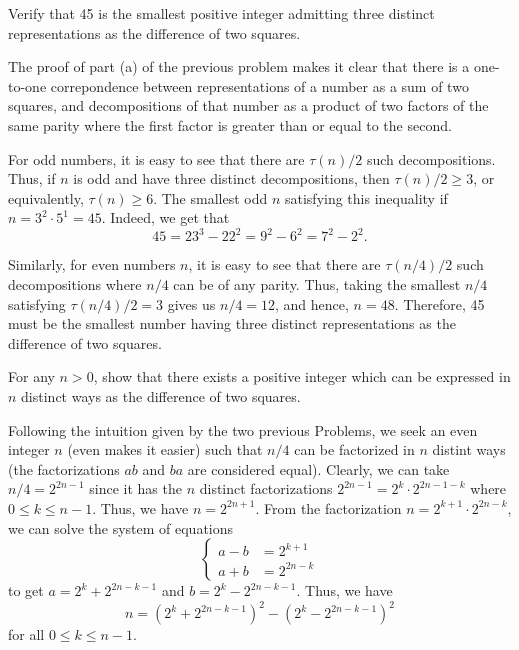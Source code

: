 \begin{exercise}
    Verify that 45 is the smallest positive integer admitting three distinct representations as the difference of two squares.  \\
\end{exercise}

\begin{solution}
    The proof of part (a) of the previous problem makes it clear that there is a one-to-one correpondence between representations of a number as a sum of two squares, and decompositions of that number as a product of two factors of the same parity where the first factor is greater than or equal to the second.
    
    For odd numbers, it is easy to see that there are $\tau(n)/2$ such decompositions. Thus, if $n$ is odd and have three distinct decompositions, then $\tau(n)/2 \geq 3$, or equivalently, $\tau(n) \geq 6$. The smallest odd $n$ satisfying this inequality if $n = 3^2 \cdot 5^1 = 45$. Indeed, we get that
    $$45 = 23^3 - 22^2 = 9^2 - 6^2 = 7^2 - 2^2.$$
    
    Similarly, for even numbers $n$, it is easy to see that there are $\tau(n/4)/2$ such decompositions where $n/4$ can be of any parity. Thus, taking the smallest $n/4$ satisfying $\tau(n/4)/2 = 3$ gives us $n/4 = 12$, and hence, $n = 48$. Therefore, 45 must be the smallest number having three distinct representations as the difference of two squares. \\
\end{solution}

\begin{exercise}
    For any $n > 0$, show that there exists a positive integer which can be expressed in $n$ distinct ways as the difference of two squares.  \\
\end{exercise}

\begin{solution}
    Following the intuition given by the two previous Problems, we seek an even integer $n$ (even makes it easier) such that $n/4$ can be factorized in $n$ distint ways (the factorizations $ab$ and $ba$ are considered equal). Clearly, we can take $n/4 = 2^{2n-1}$ since it has the $n$ distinct factorizations $2^{2n-1} = 2^k \cdot 2^{2n-1-k}$ where $0 \leq k \leq n-1$. Thus, we have $n = 2^{2n+1}$. From the factorization $n = 2^{k+1} \cdot 2^{2n-k}$, we can solve the system of equations
    $$\begin{cases}
        a-b &= 2^{k+1} \\
        a + b &= 2^{2n-k}
    \end{cases}$$
    to get $a = 2^k + 2^{2n-k-1}$ and $b = 2^k - 2^{2n-k-1}$. Thus, we have
    $$n = (2^k + 2^{2n-k-1})^2 - (2^k - 2^{2n-k-1})^2$$
    for all $0 \leq k \leq n-1$. \\
\end{solution}

